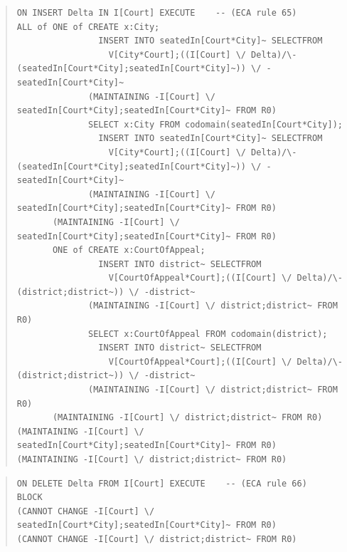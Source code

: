 \documentclass[10pt,a4paper]{report}              %
\theoremstyle{plain}\theorembodyfont{\rmfamily}\newtheorem{definition}{Definition}[section]
\theoremstyle{plain}\theorembodyfont{\rmfamily}\newtheorem{designrule}[definition]{Requirement}
\begin{document}
\begin{quote}
\begin{verbatim}
ON INSERT Delta IN I[Court] EXECUTE    -- (ECA rule 65)
ALL of ONE of CREATE x:City;
                INSERT INTO seatedIn[Court*City]~ SELECTFROM
                  V[City*Court];((I[Court] \/ Delta)/\-(seatedIn[Court*City];seatedIn[Court*City]~)) \/ -seatedIn[Court*City]~
              (MAINTAINING -I[Court] \/ seatedIn[Court*City];seatedIn[Court*City]~ FROM R0)
              SELECT x:City FROM codomain(seatedIn[Court*City]);
                INSERT INTO seatedIn[Court*City]~ SELECTFROM
                  V[City*Court];((I[Court] \/ Delta)/\-(seatedIn[Court*City];seatedIn[Court*City]~)) \/ -seatedIn[Court*City]~
              (MAINTAINING -I[Court] \/ seatedIn[Court*City];seatedIn[Court*City]~ FROM R0)
       (MAINTAINING -I[Court] \/ seatedIn[Court*City];seatedIn[Court*City]~ FROM R0)
       ONE of CREATE x:CourtOfAppeal;
                INSERT INTO district~ SELECTFROM
                  V[CourtOfAppeal*Court];((I[Court] \/ Delta)/\-(district;district~)) \/ -district~
              (MAINTAINING -I[Court] \/ district;district~ FROM R0)
              SELECT x:CourtOfAppeal FROM codomain(district);
                INSERT INTO district~ SELECTFROM
                  V[CourtOfAppeal*Court];((I[Court] \/ Delta)/\-(district;district~)) \/ -district~
              (MAINTAINING -I[Court] \/ district;district~ FROM R0)
       (MAINTAINING -I[Court] \/ district;district~ FROM R0)
(MAINTAINING -I[Court] \/ seatedIn[Court*City];seatedIn[Court*City]~ FROM R0)
(MAINTAINING -I[Court] \/ district;district~ FROM R0)
\end{verbatim}
\end{quote}
\begin{quote}
\begin{verbatim}
ON DELETE Delta FROM I[Court] EXECUTE    -- (ECA rule 66)
BLOCK
(CANNOT CHANGE -I[Court] \/ seatedIn[Court*City];seatedIn[Court*City]~ FROM R0)
(CANNOT CHANGE -I[Court] \/ district;district~ FROM R0)
\end{verbatim}
\end{quote}
\end{document}
